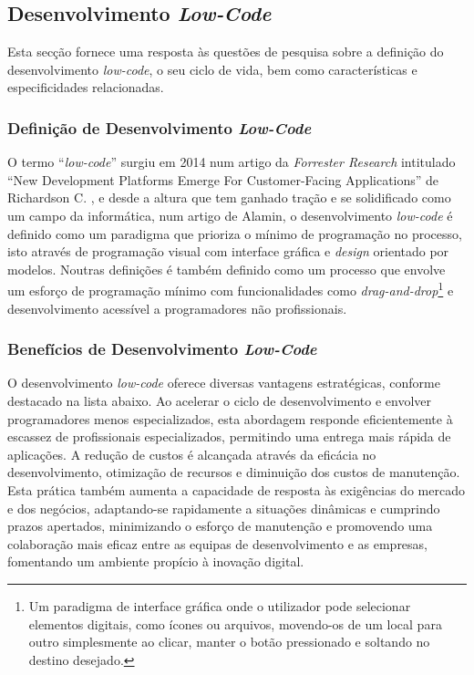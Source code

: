 
    \subsection{Desenvolvimento \textit{Low-Code}}\label{sec:low-code}

        Esta secção fornece uma resposta às questões de pesquisa sobre a definição do desenvolvimento \textit{low-code}, o seu ciclo de vida, bem como características e especificidades relacionadas.

        \subsubsection{Definição de Desenvolvimento \textit{Low-Code}}\label{secsec:defining_low-code}

            O termo ``\textit{low-code}'' surgiu em 2014 num artigo da \textit{Forrester Research} intitulado ``New Development Platforms Emerge For Customer-Facing Applications'' de Richardson C. \cite{bock2021lowcode,sanchis2020lowcode,bucaioni2022modelling,diruscio2022lowcode}, e desde a altura que tem ganhado tração e se solidificado como um campo da informática, num artigo de Alamin, \cite{alamin2021empirical} o desenvolvimento \textit{low-code} é definido como um paradigma que prioriza o mínimo de programação no processo, isto através de programação visual com interface gráfica e \textit{design} orientado por modelos. Noutras definições é também definido como um processo que envolve um esforço de programação mínimo com funcionalidades como \textit{drag-and-drop}\footnote{Um paradigma de interface gráfica onde o utilizador pode selecionar elementos digitais, como ícones ou arquivos, movendo-os de um local para outro simplesmente ao clicar, manter o botão pressionado e soltando no destino desejado.} e desenvolvimento acessível a programadores não profissionais\cite{rokis2023exploring}.

        \subsubsection{Benefícios de Desenvolvimento \textit{Low-Code}}\label{secsec:beneficios_low-code}

            O desenvolvimento \textit{low-code} oferece diversas vantagens estratégicas, conforme destacado na lista abaixo. Ao acelerar o ciclo de desenvolvimento e envolver programadores menos especializados, esta abordagem responde eficientemente à escassez de profissionais especializados, permitindo uma entrega mais rápida de aplicações. A redução de custos é alcançada através da eficácia no desenvolvimento, otimização de recursos e diminuição dos custos de manutenção. Esta prática também aumenta a capacidade de resposta às exigências do mercado e dos negócios, adaptando-se rapidamente a situações dinâmicas e cumprindo prazos apertados, minimizando o esforço de manutenção e promovendo uma colaboração mais eficaz entre as equipas de desenvolvimento e as empresas, fomentando um ambiente propício à inovação digital\cite{rokis2023exploring,yan2021impacts}.

